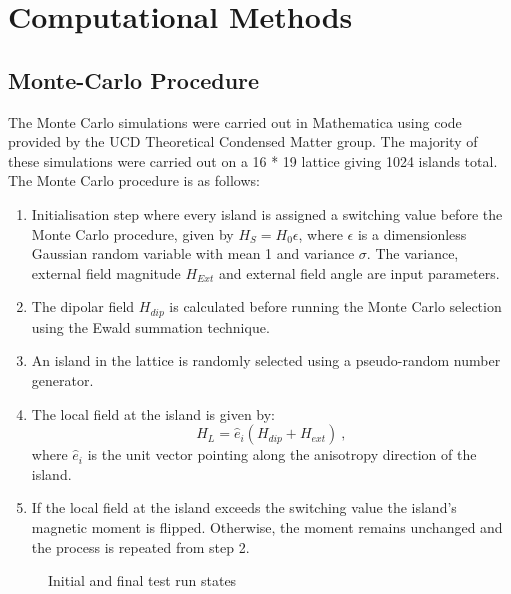 \section{Computational Methods}
\subsection{Monte-Carlo Procedure}
The Monte Carlo simulations were carried out in Mathematica using  code provided by the UCD Theoretical Condensed Matter
group. The majority of these simulations were carried out on a 16 * 19 lattice giving 1024 islands total. The Monte Carlo procedure is as follows:
\par
\begin{enumerate}
\item Initialisation step where every island is assigned a switching value before the Monte Carlo procedure, given by $H_S = H_0 \epsilon$, where $\epsilon$ is a dimensionless Gaussian random variable with mean 1 and variance $\sigma$. The variance, external field magnitude $H_{Ext}$ and external field angle are input parameters.
\item The dipolar field $H_{dip}$ is calculated before running the Monte Carlo selection using the Ewald summation technique.
\item An island in the lattice is randomly selected using a pseudo-random number generator.
\item The local field at the island is given by:
\begin{equation}
    H_L = \hat{e}_{i} (H_{dip}  + H_{ext}) \ ,
\end{equation}
where $\hat{e}_{i}$ is the unit vector pointing along the anisotropy direction of the island.
\item If the local field at the island exceeds the switching value the island's magnetic moment is flipped. Otherwise, the moment remains unchanged and the process is repeated from step 2.
\end{enumerate}
\par
\begin{figure}[ht!]
    \begin{center}
\qquad
        \caption[Initial and final test run states]{Initial and final test run states}
        \label{fig:gf10}
    \end{center}
\end{figure}
